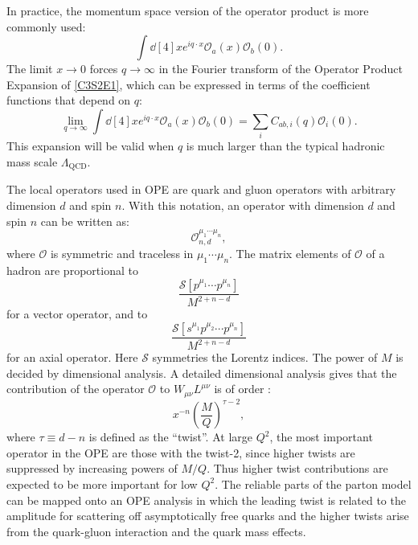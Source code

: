 In practice, the momentum space version of the operator product is more commonly used:
\begin{equation} \label{C3S2E2}
\int\dd[4]x e^{iq\cdot x}\mathcal{O}_a(x)\mathcal{O}_b(0).
\end{equation}
The limit $x\rightarrow 0$ forces $q\rightarrow\infty$ in the Fourier transform of the Operator Product Expansion of \cref{C3S2E1}, which can be expressed in terms of the coefficient functions that depend on $q$:
\begin{equation} \label{C3S2E3}
\lim_{q\rightarrow\infty}\int\dd[4]x e^{iq\cdot x}\mathcal{O}_a(x)\mathcal{O}_b(0) = \sum_iC_{ab,i}(q)\mathcal{O}_i(0).
\end{equation}
This expansion will be valid when $q$ is much larger than the typical hadronic mass scale $\Lambda_{\mathrm{QCD}}$.

The local operators used in OPE are quark and gluon operators with arbitrary dimension $d$ and spin $n$. With this notation, an operator with dimension $d$ and spin $n$ can be written as:
\begin{equation} \label{C3S2E4}
\mathcal{O}_{n,d}^{\mu_1\cdots\mu_n},
\end{equation}
where $\mathcal{O}$ is symmetric and traceless in $\mu_1\cdots\mu_n$. The matrix elements of $\mathcal{O}$ of a hadron are proportional to
\begin{equation} \label{C3S2E5}
\frac{\mathcal{S}[p^{\mu_1}\cdots p^{\mu_n}]}{M^{2+n-d}}
\end{equation}
for a vector operator, and to
\begin{equation} \label{C3S2E6}
\frac{\mathcal{S}[s^{\mu_1}p^{\mu_2}\cdots p^{\mu_n}]}{M^{2+n-d}}
\end{equation}
for an axial operator. Here $\mathcal{S}$ symmetries the Lorentz indices. The power of $M$ is decided by dimensional analysis. A detailed dimensional analysis gives that the contribution of the operator $\mathcal{O}$ to $W_{\mu\nu}L^{\mu\nu}$ is of order \cite{Manohar1992}:
\begin{equation} \label{C3S2E7}
x^{-n}\left(\frac{M}{Q}\right)^{\tau-2},
\end{equation}
where $\tau\equiv d-n$ is defined as the ``twist''. At large $Q^2$, the most important operator in the OPE are those with the twist-2, since higher twists are suppressed by increasing powers of $M/Q$. Thus higher twist contributions are expected to be more important for low $Q^2$. The reliable parts of the parton model can be mapped onto an OPE analysis in which the leading twist is related to the amplitude for scattering off asymptotically free quarks and the higher twists arise from the quark-gluon interaction and the quark mass effects.

